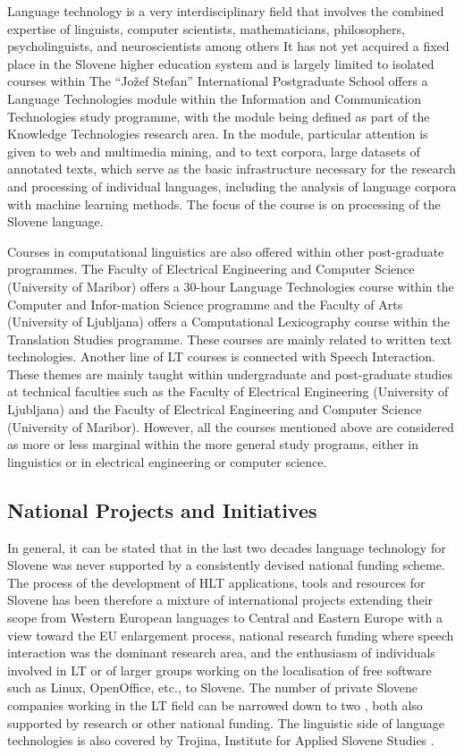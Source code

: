\begin{multicols}{2}
Language technology is a very interdisciplinary field that involves the combined expertise of linguists, computer scientists, mathematicians, philosophers, psycholinguists, and neuroscientists among others It has not yet acquired a fixed place in the Slovene higher education system and is largely limited to isolated courses within The “Jožef Stefan” International Postgraduate School offers a Language Technologies module within the Information and Communication Technologies study programme, with the module being defined as part of the Knowledge Technologies research area. In the module, particular attention is given to web and multimedia mining, and to text corpora, large datasets of annotated texts, which serve as the basic infrastructure necessary for the research and processing of individual languages, including the analysis of language corpora with machine learning methods. The focus of the course is on processing of the Slovene language. 

Courses in computational linguistics are also offered within other post-graduate programmes. The Faculty of Electrical Engineering and Computer Science (University of Maribor) offers a 30-hour Language Technologies course within the Computer and Infor-mation Science programme and the Faculty of Arts (University of Ljubljana) offers a Computational Lexicography course within the Translation Studies programme. These courses are mainly related to written text technologies.
Another line of LT courses is connected with Speech Interaction. These themes are mainly taught within undergraduate and post-graduate studies at technical faculties such as the Faculty of Electrical Engineering (University of Ljubljana) and the Faculty of Electrical Engineering and Computer Science (University of Maribor). However, all the courses mentioned above are considered as more or less marginal within the more general study programs, either in linguistics or in electrical engineering or computer science.


\subsection{National Projects and Initiatives}

In general, it can be stated that in the last two decades language technology for Slovene was never supported by a consistently devised national funding scheme. The process of the development of HLT applications, tools and resources for Slovene has been therefore a mixture of international projects extending their scope from Western European languages to Central and Eastern Europe with a view toward the EU enlargement process, national research funding where speech interaction was the dominant research area, and the enthusiasm of individuals involved in LT or of larger groups working on the localisation of free software such as Linux, OpenOffice, etc., to Slovene.  The number of private Slovene companies working in the LT field can be narrowed down to two \cite{Alp3} \cite{Amb6}, both also supported by research or other national funding. The linguistic side of language technologies is also covered by Trojina, Institute for Applied Slovene Studies \cite{Troj1}.


\end{multicols}
